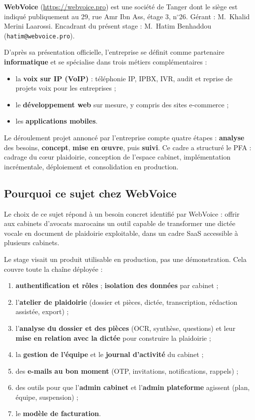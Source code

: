 \textbf{WebVoice} (\url{https://webvoice.pro}) est une société de Tanger dont le siège est indiqué publiquement au 29, rue Amr Ibn Ass, étage 3, n$^\circ$26. Gérant : M.~Khalid Merini Laarossi. Encadrant du présent stage : M.~Hatim Benhaddou (\texttt{hatim@webvoice.pro}).

D'après sa présentation officielle, l'entreprise se définit comme partenaire \textbf{informatique} et se spécialise dans trois métiers complémentaires :

\begin{itemize}[leftmargin=1.4em]
  \item la \textbf{voix sur IP (VoIP)} : téléphonie IP, IPBX, IVR, audit et reprise de projets voix pour les entreprises ;
  \item le \textbf{développement web} sur mesure, y compris des sites e-commerce ;
  \item les \textbf{applications mobiles}.
\end{itemize}

Le déroulement projet annoncé par l'entreprise compte quatre étapes : \textbf{analyse} des besoins, \textbf{concept}, \textbf{mise en œuvre}, puis \textbf{suivi}. Ce cadre a structuré le PFA : cadrage du cœur plaidoirie, conception de l'espace cabinet, implémentation incrémentale, déploiement et consolidation en production.

\subsection{Pourquoi ce sujet chez WebVoice}
Le choix de ce sujet répond à un besoin concret identifié par WebVoice : offrir aux cabinets d'avocats marocains un outil capable de transformer une dictée vocale en document de plaidoirie exploitable, dans un cadre SaaS accessible à plusieurs cabinets.

Le stage visait un produit utilisable en production, pas une démonstration. Cela couvre toute la chaîne déployée :
\begin{enumerate}[leftmargin=1.4em]
  \item \textbf{authentification et rôles} ; \textbf{isolation des données} par cabinet ;
  \item l'\textbf{atelier de plaidoirie} (dossier et pièces, dictée, transcription, rédaction assistée, export) ;
  \item l'\textbf{analyse du dossier et des pièces} (OCR, synthèse, questions) et leur \textbf{mise en relation avec la dictée} pour construire la plaidoirie ;
  \item la \textbf{gestion de l'équipe} et le \textbf{journal d'activité} du cabinet ;
  \item des \textbf{e-mails au bon moment} (OTP, invitations, notifications, rappels) ;
  \item des outils pour que l'\textbf{admin cabinet} et l'\textbf{admin plateforme} agissent (plan, équipe, suspension) ;
  \item le \textbf{modèle de facturation}.
\end{enumerate}


